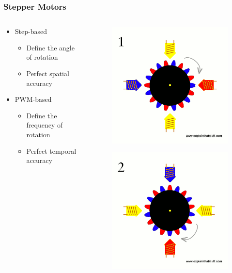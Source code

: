 \documentclass{beamer}
\begin{document}
\begin{frame}

    \frametitle{Stepper Motors}
    \begin{columns}
        \begin{column}{0.5\textwidth}

            \begin{itemize}
                \item Step-based
                    \begin{itemize}
                        \item Define the angle of rotation
                        \item Perfect spatial accuracy
                    \end{itemize}
                    \vspace{1em}
                \item PWM-based
                    \begin{itemize}
                        \item Define the frequency of rotation
                        \item Perfect temporal accuracy
                    \end{itemize}
            \end{itemize}
        \end{column}
        \begin{column}{0.5\textwidth}
            \begin{figure}
                \centering
                \includegraphics[width=0.5\columnwidth]{steppermotorimage-0.png}
            \end{figure}
            \begin{figure}
                \centering
                \includegraphics[width=0.5\columnwidth]{steppermotorimage-1.png}

\end{figure}
\end{column}
\end{columns}
\end{frame}
\end{document}
